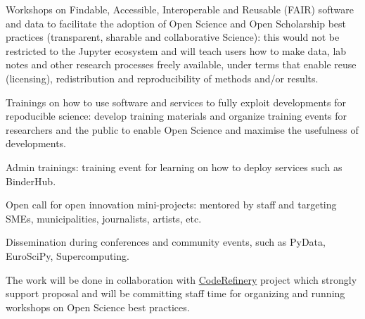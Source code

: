 \begin{task}[
  title=Training Workshops for more reproducible science,
  id=workshops,
  lead=UIO,
  PM=10,
  wphases={12-36!.416},
  partners={SRL,MP,IFR}
]
\begin{compactitem}
   \item Workshops on Findable, Accessible, Interoperable and Reusable (FAIR)
     software and data to facilitate the adoption of Open Science and Open
     Scholarship best practices (transparent, sharable and collaborative
     Science): this would not be restricted to the Jupyter ecosystem and will
     teach users how to make data, lab notes and other research processes freely
     available, under terms that enable reuse (licensing), redistribution and
     reproducibility of methods and/or results.

   \item Trainings on how to use \TheProject software and services to fully
     exploit \TheProject developments for repoducible science: develop training
     materials and organize training events for researchers and the public to
     enable Open Science and maximise the usefulness of \TheProject
     developments.

   \item \TheProject Admin trainings: training event for learning on how to
     deploy \TheProject services such as BinderHub.

   \item Open call for open innovation mini-projects: mentored by \TheProject
     staff and targeting SMEs, municipalities, journalists, artists, etc.

   \item Dissemination during conferences and community events, such as PyData,
     EuroSciPy, Supercomputing.

  \end{compactitem}
  The work will be done in collaboration with
  \href{https://coderefinery.org}{CodeRefinery} project which strongly support
  \TheProject proposal and will be committing staff time for organizing and
  running workshops on Open Science best practices. 
\end{task}
